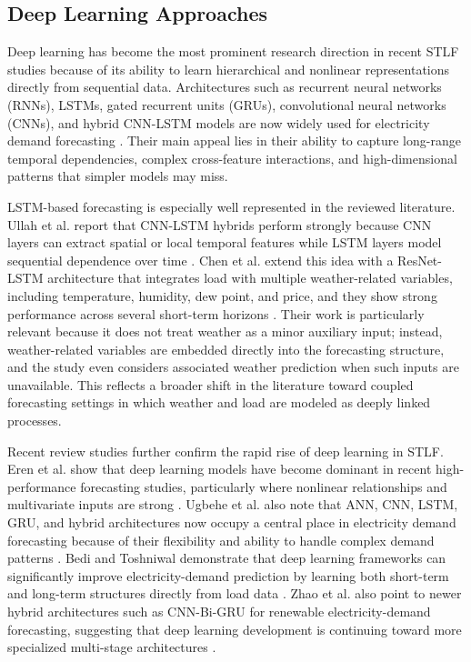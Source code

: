 \documentclass[conference]{IEEEtran}
\begin{document}
\subsection{Deep Learning Approaches}
Deep learning has become the most prominent research direction in recent STLF studies because of its ability to learn hierarchical and nonlinear representations directly from sequential data. Architectures such as recurrent neural networks (RNNs), LSTMs, gated recurrent units (GRUs), convolutional neural networks (CNNs), and hybrid CNN-LSTM models are now widely used for electricity demand forecasting \cite{bedi2019deep,10630814,Eren,ugbehe2025}. Their main appeal lies in their ability to capture long-range temporal dependencies, complex cross-feature interactions, and high-dimensional patterns that simpler models may miss.

LSTM-based forecasting is especially well represented in the reviewed literature. Ullah et al. report that CNN-LSTM hybrids perform strongly because CNN layers can extract spatial or local temporal features while LSTM layers model sequential dependence over time \cite{10630814}. Chen et al. extend this idea with a ResNet-LSTM architecture that integrates load with multiple weather-related variables, including temperature, humidity, dew point, and price, and they show strong performance across several short-term horizons \cite{Chen}. Their work is particularly relevant because it does not treat weather as a minor auxiliary input; instead, weather-related variables are embedded directly into the forecasting structure, and the study even considers associated weather prediction when such inputs are unavailable. This reflects a broader shift in the literature toward coupled forecasting settings in which weather and load are modeled as deeply linked processes.

Recent review studies further confirm the rapid rise of deep learning in STLF. Eren et al. show that deep learning models have become dominant in recent high-performance forecasting studies, particularly where nonlinear relationships and multivariate inputs are strong \cite{Eren}. Ugbehe et al. also note that ANN, CNN, LSTM, GRU, and hybrid architectures now occupy a central place in electricity demand forecasting because of their flexibility and ability to handle complex demand patterns \cite{ugbehe2025}. Bedi and Toshniwal demonstrate that deep learning frameworks can significantly improve electricity-demand prediction by learning both short-term and long-term structures directly from load data \cite{bedi2019deep}. Zhao et al. also point to newer hybrid architectures such as CNN-Bi-GRU for renewable electricity-demand forecasting, suggesting that deep learning development is continuing toward more specialized multi-stage architectures \cite{zhao2025short}.
\end{document}
